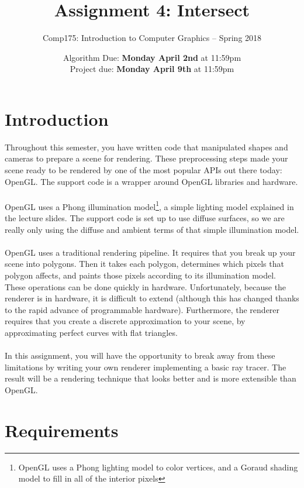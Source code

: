 \documentclass[10pt,twocolumn]{article}
\title{\Huge{\bf Assignment 4: Intersect}}
\author{Comp175: Introduction to Computer Graphics -- Spring 2018}
\date{Algorithm Due:  {\bf Monday April 2nd} at 11:59pm\\
Project due:  {\bf Monday April 9th} at 11:59pm}
\begin{document}
\maketitle

\section{Introduction}
Throughout this semester, you have written code that manipulated shapes and cameras to prepare a scene for rendering. These preprocessing steps made your scene ready to be rendered by one of the most popular APIs out there today: OpenGL. The support code is a wrapper around OpenGL libraries and hardware.\\\\
OpenGL uses a Phong illumination model\footnote{OpenGL uses a Phong lighting model to color vertices, and a Goraud shading model to fill in all of the interior pixels}, a simple lighting model explained in the lecture slides. The support code is set up to use diffuse surfaces, so we are really only using the diffuse and ambient terms of that simple illumination model.\\\\
OpenGL uses a traditional rendering pipeline. It requires that you break up your scene into polygons. Then it takes each polygon, determines which pixels that polygon affects, and paints those pixels according to its illumination model. These operations can be done quickly in hardware. Unfortunately, because the renderer is in hardware, it is difficult to extend (although this has changed thanks to the rapid advance of programmable hardware). Furthermore, the renderer requires that you create a discrete approximation to your scene, by approximating perfect curves with flat triangles.\\\\
In this assignment, you will have the opportunity to break away from these limitations by writing your own renderer implementing a basic ray tracer. The result will be a rendering technique that looks better and is more extensible than OpenGL.

\section{Requirements}
\end{document}
